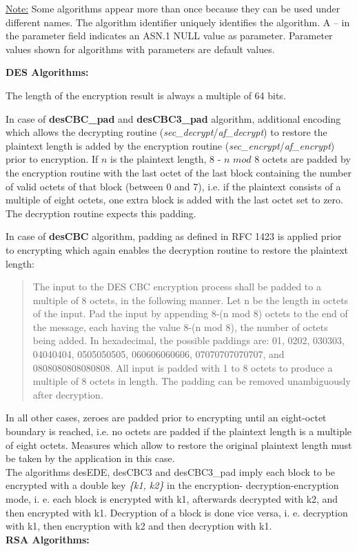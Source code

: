 \underline{Note:} Some algorithms appear more than once because they can be used under 
different names.
The algorithm identifier uniquely identifies the algorithm. A -- in the parameter field 
indicates an ASN.1 NULL value as parameter. Parameter values shown for algorithms
with parameters are default values. 

{\large\bf DES Algorithms:} 
 
The length of the encryption result is always a multiple of 64 bits. 
 
In case of {\bf desCBC\_pad} and {\bf desCBC3\_pad} 
algorithm, additional encoding which allows 
the decrypting routine ({\em sec\_de\-crypt}/{\em af\_decrypt}) to restore 
the plaintext length is added 
by the encryption routine ({\em sec\_encrypt}/{\em af\_encrypt}) prior to 
encryption. 
If $n$ is the plaintext length,
8 - $n$ $mod$ 8 octets are padded by the encryption routine with
the last octet of the last block containing the number of 
valid octets of that block (between 0 and 7), i.e. if the plaintext 
consists 
of a multiple of eight octets, one extra block is added with the last octet 
set to zero. 
The decryption routine expects this padding. 
 
In case of {\bf desCBC} algorithm, 
padding as defined in RFC 1423 is applied prior to encrypting
which again enables the decryption routine to restore the plaintext length:
\begin{quote}
   The input to the DES CBC encryption process shall be padded to a
   multiple of 8 octets, in the following manner.  Let n be the length
   in octets of the input.  Pad the input by appending 8-(n mod 8)
   octets to the end of the message, each having the value 8-(n mod 8),
   the number of octets being added.  In hexadecimal, the possible
   paddings are:  01, 0202, 030303, 04040404, 0505050505, 060606060606,
   07070707070707, and 0808080808080808.  All input is padded with 1 to
   8 octets to produce a multiple of 8 octets in length.  The padding
   can be removed unambiguously after decryption.
\end{quote} 
In all other cases,
zeroes are padded prior to encrypting until an eight-octet boundary is 
reached, i.e.
no octets are padded if the plaintext length is a multiple of eight octets.
Measures which allow to restore the original plaintext length must
be taken by the application in this case.
\\ [1em]
The algorithms desEDE, desCBC3 and desCBC3\_pad imply each block
to be encrypted with a double key {\em \{k1, k2\}} in the encryption-
decryption-encryption mode,
i. e. each block is encrypted with k1, afterwards decrypted with k2, and 
then encrypted with k1.
Decryption of a block is done vice versa, i. e. decryption with k1, then 
encryption with k2
and then decryption with k1.
\\ [1em]
{\large\bf RSA Algorithms:}


